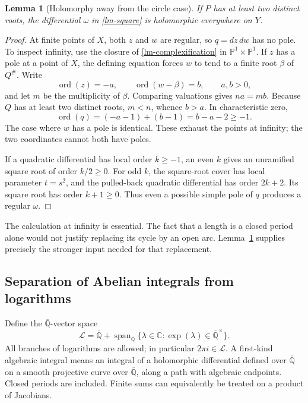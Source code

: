 \documentclass[11pt,a4paper]{article}
\newtheorem{lemma}[theorem]{Lemma}
\theoremstyle{definition}
\theoremstyle{remark}
\numberwithin{equation}{section}
\newcommand{\Qbar}{\overline{\mathbb Q}}
\begin{document}
\begin{lemma}[Holomorphy away from the circle case]\label{lm-holomorphy}
If $P$ has at least two distinct roots, the differential $\omega$ in
\eqref{lm-square} is holomorphic everywhere on $Y$.
\end{lemma}

\begin{proof}
At finite points of $X$, both $z$ and $w$ are regular, so $q=dz\,dw$ has
no pole.  To inspect infinity, use the closure of
\eqref{lm-complexification} in $\mathbb P^1\times\mathbb P^1$.  If $z$
has a pole at a point of $X$, the defining equation forces $w$ to tend to
a finite root $\beta$ of $Q^\#$.  Write
\[
 \operatorname{ord}(z)=-a,\qquad
 \operatorname{ord}(w-\beta)=b,\qquad a,b>0,
\]
and let $m$ be the multiplicity of $\beta$.  Comparing valuations gives
$na=mb$.  Because $Q$ has at least two distinct roots, $m<n$, whence
$b>a$.  In characteristic zero,
\begin{equation}\label{lm-order}
 \operatorname{ord}(q)=(-a-1)+(b-1)=b-a-2\ge-1.
\end{equation}
The case where $w$ has a pole is identical.  These exhaust the points at
infinity; the two coordinates cannot both have poles.

If a quadratic differential has local order $k\ge-1$, an even $k$ gives
an unramified square root of order $k/2\ge0$.  For odd $k$, the square-root
cover has local parameter $t=s^2$, and the pulled-back quadratic
differential has order $2k+2$.  Its square root has order $k+1\ge0$.
Thus even a possible simple pole of $q$ produces a regular $\omega$.
\end{proof}

The calculation at infinity is essential.  The fact that a length is a
closed period alone would not justify replacing its cycle by an open arc.
Lemma~\ref{lm-holomorphy} supplies precisely the stronger input needed for
that replacement.

\subsection{Separation of Abelian integrals from logarithms}

Define the $\Qbar$-vector space
\begin{equation}\label{lm-logspace}
 \mathcal L=\Qbar+
 \operatorname{span}_{\Qbar}
 \{\lambda\in\mathbb C:\exp(\lambda)\in\Qbar^\times\}.
\end{equation}
All branches of logarithms are allowed; in particular $2\pi i\in
\mathcal L$.  A first-kind algebraic integral means an integral of a
holomorphic differential defined over $\Qbar$ on a smooth projective
curve over $\Qbar$, along a path with algebraic endpoints.  Closed
periods are included.  Finite sums can equivalently be treated on a
product of Jacobians.
\end{document}
